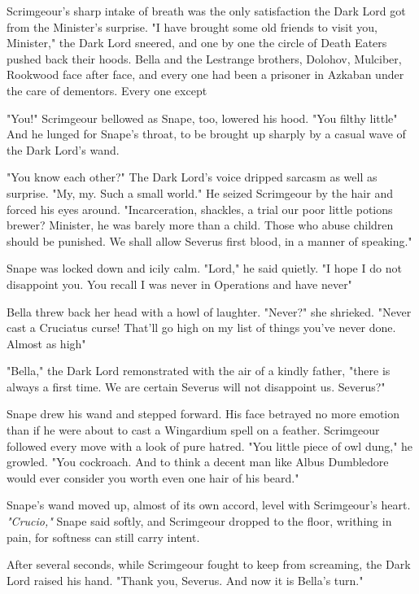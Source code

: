 Scrimgeour's sharp intake of breath was the only satisfaction the Dark Lord got from the Minister's surprise. "I have brought some old friends to visit you, Minister," the Dark Lord sneered, and one by one the circle of Death Eaters pushed back their hoods. Bella and the Lestrange brothers, Dolohov, Mulciber, Rookwood{\el} face after face, and every one had been a prisoner in Azkaban under the care of dementors. Every one except{\el}

"You!" Scrimgeour bellowed as Snape, too, lowered his hood. "You filthy little{\el}" And he lunged for Snape's throat, to be brought up sharply by a casual wave of the Dark Lord's wand.

"You know each other?" The Dark Lord's voice dripped sarcasm as well as surprise. "My, my. Such a small world." He seized Scrimgeour by the hair and forced his eyes around. "Incarceration, shackles, a trial{\el} our poor little potions brewer? Minister, he was barely more than a child. Those who abuse children should be punished. We shall allow Severus first blood, in a manner of speaking."

Snape was locked down and icily calm. "Lord," he said quietly. "I hope I do not disappoint you. You recall I was never in Operations and have never{\el}"

Bella threw back her head with a howl of laughter. "Never?" she shrieked. "Never cast a Cruciatus curse! That'll go high on my list of things you've never done. Almost as high{\el}"

"Bella," the Dark Lord remonstrated with the air of a kindly father, "there is always a first time. We are certain Severus will not disappoint us. Severus?"

Snape drew his wand and stepped forward. His face betrayed no more emotion than if he were about to cast a Wingardium spell on a feather. Scrimgeour followed every move with a look of pure hatred. "You little piece of owl dung," he growled. "You cockroach. And to think a decent man like Albus Dumbledore would ever consider you worth even one hair of his beard."

Snape's wand moved up, almost of its own accord, level with Scrimgeour's heart. \emph{"Crucio,"} Snape said softly, and Scrimgeour dropped to the floor, writhing in pain, for softness can still carry intent.

After several seconds, while Scrimgeour fought to keep from screaming, the Dark Lord raised his hand. "Thank you, Severus. And now it is Bella's turn."

